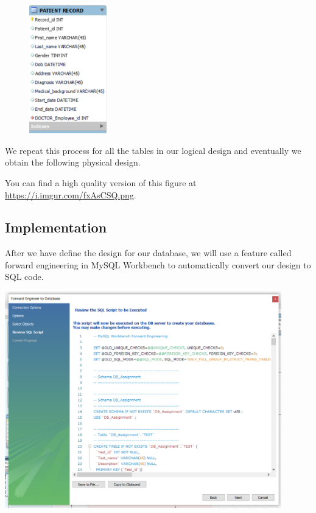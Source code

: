 \documentclass[a4paper]{article}
\numberwithin{equation}{section}
\begin{document}
\begin{figure}[H]
  \centering
  \includegraphics[width=0.3\textwidth]{./assets/physical.record.png}\label{Medical record}
\end{figure}

We repeat this process for all the tables in our logical design and eventually we obtain the following physical design.

You can find a high quality version of this figure at \url{https://i.imgur.com/fxAsCSQ.png}.

\subsection{Implementation}
After we have define the design for our database, we will use a feature called forward engineering in MySQL Workbench to automatically convert our design to SQL code.

\begin{center}
  \includegraphics[width=0.9\textwidth]{./assets/step1.png}
\end{center}
\end{document}
